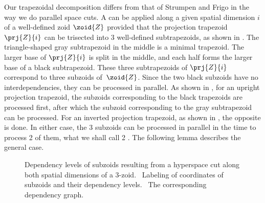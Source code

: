 
Our trapezoidal decomposition differs from that of Strumpen and Frigo
in the way we do parallel space cuts.  A  can
be applied along a given spatial dimension $i$ of a well-defined zoid
$\zoid{Z}$ provided that the projection trapezoid $\prj{Z}{i}$ can be
trisected into 3 well-defined subtrapezoids, as shown in
.  The triangle-shaped
gray subtrapezoid in the middle is a minimal trapezoid.  The larger
base of $\prj{Z}{i}$ is split in the middle, and each half forms the
larger base of a black subtrapezoid.  These three subtrapezoids of
$\prj{Z}{i}$ correspond to three subzoids of~$\zoid{Z}$.  Since the two
black subzoids have no interdependencies, they can be processed in
parallel.  As shown in , for an upright
projection trapezoid, the subzoids corresponding to the black
trapezoids are processed first, after which the subzoid corresponding
to the gray subtrapezoid can be processed.  For an inverted projection
trapezoid, as shown in , the opposite is
done.  In either case, the 3 subzoids can be processed in parallel in
the time to process 2 of them, what we shall call 2 .  The following lemma describes the general case.

\begin{figure}
\centering

\hspace{2cm}
 \vspace{-0.3cm}
 \caption{Dependency levels of subzoids resulting from a hyperspace
   cut along both spatial dimensions of a $3$-zoid.
   ~Labeling of coordinates of subzoids and
   their dependency levels.  ~The corresponding
   dependency graph.}%
 \label{fig:sim-space-cut}%
\end{figure}%

